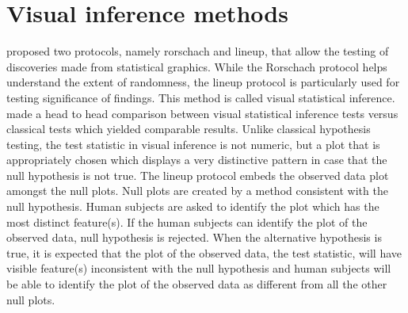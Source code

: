 %
%
%
%
%
%

\section{Visual inference methods} \label{sec:inference}

\cite{buja:2009} proposed two protocols, namely rorschach and lineup,  that allow the testing of discoveries made from statistical graphics. While the Rorschach protocol helps understand the extent of randomness, the lineup protocol is particularly used for testing significance of findings. This method is called visual statistical inference. \cite{majumder:2011} made a head to head comparison between visual statistical inference tests versus classical tests which yielded comparable results. Unlike classical hypothesis testing, the test statistic in visual inference is not numeric, but a plot that is appropriately chosen which displays a very distinctive pattern in case that the null hypothesis is not true. The lineup protocol embeds the observed data plot amongst the null plots. Null plots are created by a method consistent with the null hypothesis. Human subjects are asked to identify the plot which has the most distinct feature(s). If the human subjects can identify the plot of the observed data, null hypothesis is rejected. When the alternative hypothesis is true, it is expected that the plot of the observed data, the test statistic, will have visible feature(s) inconsistent with the null hypothesis and human subjects will be able to identify the plot of the observed data as different from all the other null plots. 

